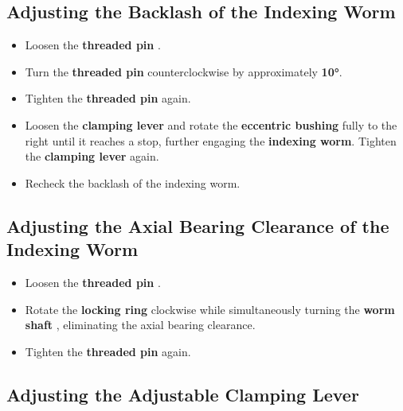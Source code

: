 \subsection*{Adjusting the Backlash of the Indexing Worm}

\begin{itemize}
    \item Loosen the \textbf{threaded pin }.
    \item Turn the \textbf{threaded pin } counterclockwise by approximately \textbf{10°}.
    \item Tighten the \textbf{threaded pin } again.
    \item Loosen the \textbf{clamping lever } and rotate the \textbf{eccentric bushing } fully to the right until it reaches a stop, further engaging the \textbf{indexing worm}. Tighten the \textbf{clamping lever } again.
    \item Recheck the backlash of the indexing worm.
\end{itemize}


\newpage

\subsection*{Adjusting the Axial Bearing Clearance of the Indexing Worm}

\begin{itemize}
    \item Loosen the \textbf{threaded pin }.\footnotemark[1]
    \item Rotate the \textbf{locking ring } clockwise while simultaneously turning the \textbf{worm shaft }, eliminating the axial bearing clearance.
    \item Tighten the \textbf{threaded pin } again.
\end{itemize}

\subsection*{Adjusting the Adjustable Clamping Lever}

